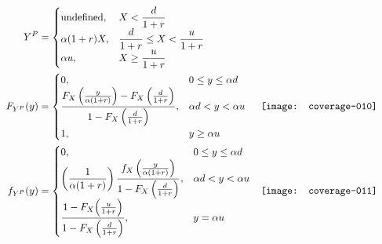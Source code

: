 \documentclass{article}
\newcommand{\D}{\displaystyle}
\begin{document}
\begin{align*}
  Y^P
  &=
  \begin{cases}
    \text{undefined},
      & X < \D \frac{d}{1 + r} \\
    \alpha (1 + r) X,
      & \D\frac{d}{1 + r} \leq X < \frac{u}{1 + r} \\
    \alpha u,
      & \D X \geq \frac{u}{1 + r}
  \end{cases} & \\
  F_{Y^P}(y)
  &=
  \begin{cases}
    0,
      & 0 \leq y \leq \alpha d \\
    \D\frac{F_X \left( \frac{y}{\alpha (1 + r)} \right) - F_X
      \left( \frac{d}{1 + r} \right)}{%
      1 - F_X \left( \frac{d}{1 + r} \right)},
      & \alpha d < y < \alpha u \\
    1,
      & y \geq \alpha u
  \end{cases} &
  \begin{minipage}{0.4\linewidth}
\texttt{[image: coverage-010]}
  \end{minipage} \\
  f_{Y^P}(y)
  &=
  \begin{cases}
    0,
      & 0 \leq y \leq \alpha d \\
    \left( \D\frac{1}{\alpha (1 + r)} \right)
    \D\frac{f_X \left( \frac{y}{\alpha(1 + r)} \right)}{%
      1 - F_X \left( \frac{d}{1 + r} \right)},
      & \alpha d < y < \alpha u \\
    \D\frac{1 - F_X \Big( \frac{u}{1 + r} \Big)}{%
      1 - F_X \left( \frac{d}{1 + r} \right)},
      & y = \alpha u
  \end{cases} &
  \begin{minipage}{0.4\linewidth}
\texttt{[image: coverage-011]}
  \end{minipage}
\end{align*}
\end{document}
